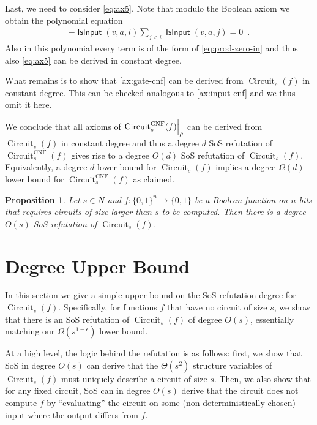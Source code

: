 \documentclass[10pt,a4paper]{article}
\theoremstyle{plain}
\newtheorem{proposition}[theorem]{Proposition}
\theoremstyle{remark}
\theoremstyle{definition}
\newcommand{\eqperiod}{\enspace .}
\newcommand{\set}[1]{\{#1\}}
\newcommand\restrict[2]{{%
  \left.\kern-\nulldelimiterspace %
  #1 %
  \vphantom{\big|} %
  \right|_{#2} %
  }}
\newcommand{\vars}[1]{\mathsf{#1}}
\DeclareMathOperator{\circuit}{Circuit}
\DeclareMathOperator{\isvar}{\vars{IsInput}}
\begin{document}
Last, we need to consider \cref{eq:ax5}. Note that modulo the Boolean
axiom we obtain the polynomial equation
\begin{align}
  - \isvar(v,a,i)\sum_{j < i}\isvar(v,a,j) = 0 \eqperiod
\end{align}
Also in this polynomial every term is of the form of
\cref{eq:prod-zero-in} and thus also \cref{eq:ax5} can be derived in
constant degree.

What remains is to show that \cref{ax:gate-cnf} can be derived from
$\circuit_s(f)$ in constant degree. This can be checked analogous to
\cref{ax:input-cnf} and we thus omit it here.

We conclude that all axioms of $\restrict{\circuit^{\mathrm{CNF}}_s(f)}{\rho}$ can
be derived from $\circuit_s(f)$ in constant degree and thus a degree
$d$ SoS refutation of $\circuit_s^{\mathrm{CNF}}(f)$ gives rise to a degree
$O(d)$ SoS refutation of $\circuit_s(f)$. Equivalently, a degree $d$
lower bound for $\circuit_s(f)$ implies a degree $\Omega(d)$ lower
bound for $\circuit_s^{\mathrm{CNF}}(f)$ as claimed.

\begin{proposition}
  Let $s \in N$ and $f: \set{0,1}^n \rightarrow \set{0,1}$ be a
  Boolean function on $n$ bits that requires circuits of size larger
  than $s$ to be computed. Then there is a degree $O(s)$ SoS
  refutation of $\circuit_s(f)$.
\end{proposition}

\section{Degree Upper Bound}
\label{sec:upper-bound}

In this section we give a simple upper bound on the SoS refutation
degree for $\circuit_s(f)$.  Specifically, for functions $f$ that have
no circuit of size $s$, we show that there is an SoS refutation of
$\circuit_s(f)$ of degree $O(s)$, essentially matching our
$\Omega(s^{1-\epsilon})$ lower bound.

At a high level, the logic behind the refutation is as follows: first,
we show that SoS in degree $O(s)$ can derive that the $\Theta(s^2)$
structure variables of $\circuit_s(f)$ must uniquely describe a
circuit of size $s$.  Then, we also show that for any fixed circuit,
SoS can in degree $O(s)$ derive that the circuit does not compute $f$
by ``evaluating'' the circuit on some (non-deterministically chosen)
input where the output differs from $f$.
\end{document}

